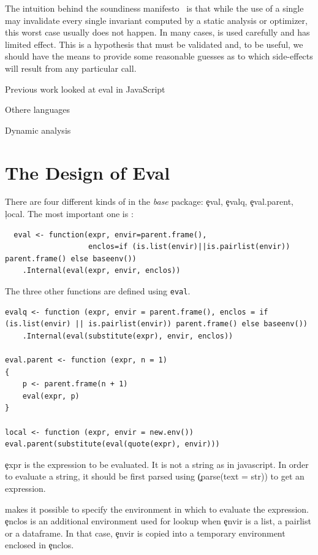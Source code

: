 \documentclass[conference]{IEEEtran}
\begin{document}
The intuition behind the soundiness manifesto~\cite{soundy} is that while
the use of a single \eval may invalidate every single invariant computed by
a static analysis or optimizer, this worst case usually does not happen.  In
many cases, \eval is used carefully and has limited effect. This is a
hypothesis that must be validated and, to be useful, we should have the
means to provide some reasonable guesses as to which side-effects will
result from any particular \eval call.



Previous work looked at eval in JavaScript

Othere languages

Dynamic analysis

\section{The Design of Eval}

There are four different kinds of \eval in the \emph{base} package:
\c{eval}, \c{evalq}, \c{eval.parent}, \c{local}.  The most important one is
\eval:

\begin{lstlisting}
  eval <- function(expr, envir=parent.frame(),
                   enclos=if (is.list(envir)||is.pairlist(envir)) parent.frame() else baseenv())  
	.Internal(eval(expr, envir, enclos))
\end{lstlisting}




The three other functions are defined using \lstinline|eval|.

\begin{lstlisting}
evalq <- function (expr, envir = parent.frame(), enclos = if (is.list(envir) || is.pairlist(envir)) parent.frame() else baseenv())  
	.Internal(eval(substitute(expr), envir, enclos))
	
eval.parent <- function (expr, n = 1) 
{
	p <- parent.frame(n + 1)
	eval(expr, p)
}

local <- function (expr, envir = new.env()) eval.parent(substitute(eval(quote(expr), envir)))
\end{lstlisting}


\c{expr} is the expression to be evaluated. It is not a string as in javascript. In order to evaluate a string, it should be first parsed using \c(parse(text = str)) to get an expression.

\eval makes it possible to specify the environment in which to evaluate the expression. \c{enclos} is an additional environment used for lookup when \c{envir} is a list, a pairlist or a dataframe. In that case, \c{envir} is copied into a temporary environment enclosed in \c{enclos}.
\end{document}
